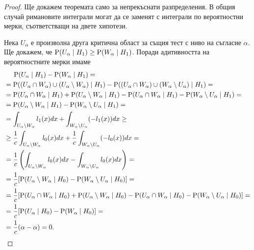 \documentclass[numbers=endperiod, DIV=15, bibliography=totocnumbered]{scrartcl}
\begin{document}
\begin{proof}
  Ще докажем теоремата само за непрекъснати разпределения. В общия случай римановите интеграли могат да се заменят с интеграли по вероятностни мерки, съответстващи на двете хипотези.

  Нека $U_\alpha$ е произволна друга критична област за същия тест с ниво на съгласие $\alpha$. Ще докажем, че $\operatorname{P}(U_\alpha \mid H_1) \geq \operatorname{P}(W_\alpha \mid H_1)$. Поради адитивността на вероятностните мерки имаме
  \begin{align*}
    &\hspace{0.45cm}\operatorname{P}(U_\alpha \mid H_1) - \operatorname{P}(W_\alpha \mid H_1)
    = \\ &=
    \operatorname{P}((U_\alpha \cap W_\alpha) \cup (U_\alpha \setminus W_\alpha) \mid H_1) - \operatorname{P}((U_\alpha \cap W_\alpha) \cup (W_\alpha \setminus U_\alpha) \mid H_1)
    = \\ &=
    \operatorname{P}(U_\alpha \cap W_\alpha \mid H_1) + \operatorname{P}(U_\alpha \setminus W_\alpha \mid H_1) - \operatorname{P}(U_\alpha \cap W_\alpha \mid H_1) - \operatorname{P}(W_\alpha \setminus U_\alpha \mid H_1)
    = \\ &=
    \operatorname{P}(U_\alpha \setminus W_\alpha \mid H_1) - \operatorname{P}(W_\alpha \setminus U_\alpha \mid H_1)
    = \\ &=
    \int_{U_\alpha \setminus W_\alpha} l_1(x) dx + \int_{W_\alpha \setminus U_\alpha} (-l_1(x)) dx
    \geq \\ &\geq
    \frac 1 c \int_{U_\alpha \setminus W_\alpha} l_0(x) dx + \frac 1 c \int_{W_\alpha \setminus U_\alpha} (-l_0(x)) dx
    = \\ &=
    \frac 1 c \left( \int_{U_\alpha \setminus W_\alpha} l_0(x) dx - \int_{W_\alpha \setminus U_\alpha} l_0(x) dx \right)
    = \\ &=
    \frac 1 c [\operatorname{P}(U_\alpha \setminus W_\alpha \mid H_0) - \operatorname{P}(W_\alpha \setminus U_\alpha \mid H_0)]
    = \\ &=
    \frac 1 c [\operatorname{P}(U_\alpha \cap W_\alpha \mid H_0) + \operatorname{P}(U_\alpha \setminus W_\alpha \mid H_0) - \operatorname{P}(U_\alpha \cap W_\alpha \mid H_0) - \operatorname{P}(W_\alpha \setminus U_\alpha \mid H_0)]
    = \\ &=
    \frac 1 c [\operatorname{P}(U_\alpha \mid H_0) - \operatorname{P}(W_\alpha \mid H_0)]
    = \\ &=
    \frac 1 c (\alpha - \alpha)
    =
    0.
  \end{align*}
\end{proof}

\printbibliography
\end{document}
